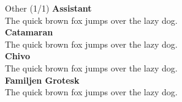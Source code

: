 \documentclass[10pt]{beamer}
\begin{document}
\begin{frame}{Other (1/1)}
\vspace{-0.2cm}
  {\AssistantLocal\Large\bfseries Assistant\\}
  {\AssistantLocal The quick brown fox jumps over the lazy dog.\\[0.3cm]}
  {\CatamaranLocal\Large\bfseries Catamaran\\}
  {\CatamaranLocal The quick brown fox jumps over the lazy dog.\\[0.3cm]}
  {\ChivoLocal\Large\bfseries Chivo\\}
  {\ChivoLocal The quick brown fox jumps over the lazy dog.\\[0.3cm]}
  {\FamiljenGroteskLocal\Large\bfseries Familjen Grotesk\\}
  {\FamiljenGroteskLocal The quick brown fox jumps over the lazy dog.\\[0.3cm]}
\end{frame}
\end{document}
